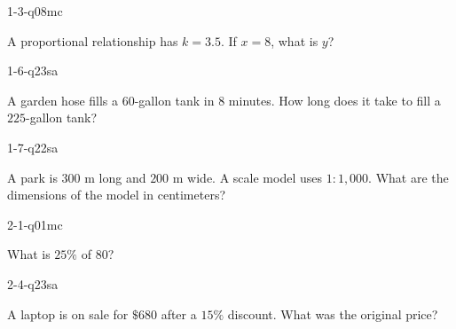 
\begin{practiceQuestion}{1-3-q08}{mc}
\begin{questionText}
A proportional relationship has $k = 3.5$. If $x = 8$, what is $y$?
\end{questionText}
\end{practiceQuestion}

\begin{practiceQuestion}{1-6-q23}{sa}
\begin{questionText}
A garden hose fills a $60$-gallon tank in $8$ minutes. How long does it take to fill a $225$-gallon tank?
\end{questionText}
\end{practiceQuestion}

\begin{practiceQuestion}{1-7-q22}{sa}
\begin{questionText}
A park is $300$ m long and $200$ m wide. A scale model uses $1 : 1{,}000$. What are the dimensions of the model in centimeters?
\end{questionText}
\end{practiceQuestion}

\begin{practiceQuestion}{2-1-q01}{mc}
\begin{questionText}
What is $25\%$ of $80$?
\end{questionText}
\end{practiceQuestion}

\begin{practiceQuestion}{2-4-q23}{sa}
\begin{questionText}
A laptop is on sale for $\$680$ after a $15\%$ discount. What was the original price?
\end{questionText}
\end{practiceQuestion}

